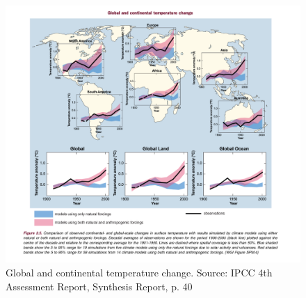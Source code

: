 \begin{figure}
\includegraphics[width=160mm]{s2-attribution.PNG}
\centering
\caption{Global and continental temperature change. Source: IPCC 4th Assessment Report, Synthesis Report, p. 40}
\label{fig:CO2increase}
\end{figure}



